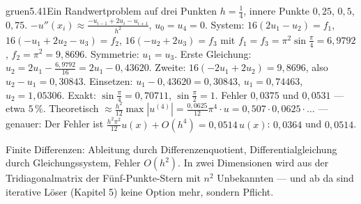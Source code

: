 \begin{loesungkarte}{gruen}{5.41}{Ein Randwertproblem auf drei Punkten}
$h = \frac14$, innere Punkte $0{,}25$, $0{,}5$, $0{,}75$. $-u''(x_i)\approx\frac{-u_{i-1} + 2u_i - u_{i+1}}{h^{2}}$, $u_0 = u_4 = 0$. System: $16(2u_1 - u_2) = f_1$, $16(-u_1 + 2u_2 - u_3) = f_2$, $16(-u_2 + 2u_3) = f_3$ mit $f_1 = f_3 = \pi^{2}\sin\frac\pi4 = 6{,}9792$, $f_2 = \pi^{2} = 9{,}8696$.
Symmetrie: $u_1 = u_3$. Erste Gleichung: $u_2 = 2u_1 - \frac{6{,}9792}{16} = 2u_1 - 0{,}43620$. Zweite: $16(-2u_1 + 2u_2) = 9{,}8696$, also $u_2 - u_1 = 0{,}30843$. Einsetzen: $u_1 - 0{,}43620 = 0{,}30843$, $u_1 = 0{,}74463$, $u_2 = 1{,}05306$.
Exakt: $\sin\frac\pi4 = 0{,}70711$, $\sin\frac\pi2 = 1$. Fehler $0{,}0375$ und $0{,}0531$ --- etwa $5\,\%$. Theoretisch $\approx\frac{h^{2}}{12}\max|u^{(4)}| = \frac{0{,}0625}{12}\pi^{4}\cdot u = 0{,}507\cdot0{,}0625\cdot\dots$ --- genauer: Der Fehler ist $\frac{h^{2}\pi^{2}}{12}u(x) + O(h^{4}) = 0{,}0514\,u(x)$: $0{,}0364$ und $0{,}0514$. \checkmark
{}
\begin{mitnehmen}\kastentext
Finite Differenzen: Ableitung durch Differenzenquotient, Differentialgleichung durch Gleichungssystem, Fehler $O(h^{2})$. In zwei Dimensionen wird aus der Tridiagonalmatrix der Fünf-Punkte-Stern mit $n^{2}$ Unbekannten --- und ab da sind iterative Löser (Kapitel 5) keine Option mehr, sondern Pflicht.
\end{mitnehmen}
\end{loesungkarte}

